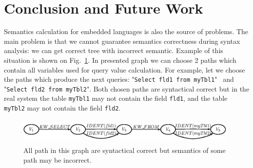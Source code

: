 \section{Conclusion and Future Work}
\label{sec:Conclusion}





 
Semantics calculation for embedded languages is also the source of problems. The main problem is 
that we cannot guarantee semantics correctness during syntax analysis: we can get correct tree 
with incorrect semantic. Example of this situation is shown on Fig.~\ref{pic7}. In presented 
graph we can choose 2 paths which contain all variables used for query value calculation. For 
example, let we choose the paths which produce the next queries: "\verb|Select fld1 from myTbl1|" \ and "\verb|Select fld2 from myTbl2|". 
Both chosen paths are syntactical correct but in the real system the table \verb|myTbl1| may not contain 
the field \verb|fld1|, and the table  \verb|myTbl2| may not contain the field \verb|fld2|.  

\begin{figure}
    \begin{center}
        \includegraphics[width=11cm,height=1.3cm]{graphs/semantics_example.eps}
        \caption{ All path in this graph are syntactical correct but semantics of some path may be incorrect.}
        \label{pic7}
    \end{center}
\end{figure}

